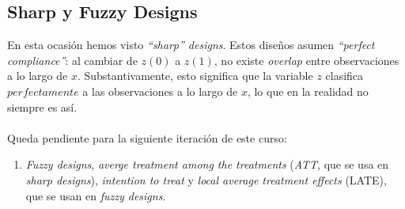 \documentclass[10pt]{article}
\begin{document}
\subsection*{Sharp y Fuzzy Designs}

En esta ocasi\'on hemos visto \emph{``sharp'' designs}. Estos dise\~nos asumen \emph{``perfect compliance''}: al cambiar de $z(0)$ a $z(1)$, no existe \emph{overlap} entre observaciones a lo largo de $x$. Substantivamente, esto significa que la variable $z$ clasifica $perfectamente$ a las observaciones a lo largo de $x$, lo que en la realidad no siempre es as\'i.

\paragraph{}Queda pendiente para la siguiente iteraci\'on de este curso:

\begin{enumerate}
	\item \emph{Fuzzy designs}, \emph{averge treatment among the treatments} (\emph{ATT}, que se usa en \emph{sharp designs}), \emph{intention to treat} y \emph{local average treatment effects} (LATE), que se usan en \emph{fuzzy designs}.
\end{enumerate}
\end{document}
